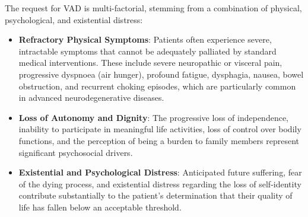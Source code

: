 The request for VAD is multi-factorial, stemming from a combination of physical, psychological, and existential distress:
\begin{itemize}
    \item \textbf{Refractory Physical Symptoms}: Patients often experience severe, intractable symptoms that cannot be adequately palliated by standard medical interventions. These include severe neuropathic or visceral pain, progressive dyspnoea (air hunger), profound fatigue, dysphagia, nausea, bowel obstruction, and recurrent choking episodes, which are particularly common in advanced neurodegenerative diseases.
    \item \textbf{Loss of Autonomy and Dignity}: The progressive loss of independence, inability to participate in meaningful life activities, loss of control over bodily functions, and the perception of being a burden to family members represent significant psychosocial drivers.
    \item \textbf{Existential and Psychological Distress}: Anticipated future suffering, fear of the dying process, and existential distress regarding the loss of self-identity contribute substantially to the patient's determination that their quality of life has fallen below an acceptable threshold.
\end{itemize}

